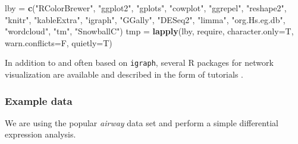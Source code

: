 \documentclass[9pt,a4paper,]{extarticle}
\newenvironment{Shaded}{\begin{snugshade}}{\end{snugshade}}
\newcommand{\KeywordTok}[1]{\textcolor[rgb]{0.13,0.29,0.53}{\textbf{#1}}}
\newcommand{\DataTypeTok}[1]{\textcolor[rgb]{0.13,0.29,0.53}{#1}}
\newcommand{\StringTok}[1]{\textcolor[rgb]{0.31,0.60,0.02}{#1}}
\newcommand{\OperatorTok}[1]{\textcolor[rgb]{0.81,0.36,0.00}{\textbf{#1}}}
\newcommand{\NormalTok}[1]{#1}
\begin{document}
\begin{Shaded}
\begin{Highlighting}[]
\NormalTok{lby =}\StringTok{ }\KeywordTok{c}\NormalTok{(}\StringTok{"RColorBrewer"}\NormalTok{, }\StringTok{"ggplot2"}\NormalTok{, }\StringTok{"gplots"}\NormalTok{, }\StringTok{"cowplot"}\NormalTok{, }
        \StringTok{"ggrepel"}\NormalTok{, }\StringTok{"reshape2"}\NormalTok{, }\StringTok{"knitr"}\NormalTok{, }\StringTok{"kableExtra"}\NormalTok{,}
        \StringTok{"igraph"}\NormalTok{, }\StringTok{"GGally"}\NormalTok{, }
        \StringTok{"DESeq2"}\NormalTok{, }\StringTok{"limma"}\NormalTok{, }\StringTok{"org.Hs.eg.db"}\NormalTok{, }
        \StringTok{"wordcloud"}\NormalTok{, }\StringTok{"tm"}\NormalTok{, }\StringTok{"SnowballC"}\NormalTok{)}
\NormalTok{tmp =}\StringTok{ }\KeywordTok{lapply}\NormalTok{(lby, require, }\DataTypeTok{character.only=}\NormalTok{T, }\DataTypeTok{warn.conflicts=}\NormalTok{F, }\DataTypeTok{quietly=}\NormalTok{T)}
\end{Highlighting}
\end{Shaded}

In addition to and often based on \texttt{igraph}, several R packages for network visualization are available and described in the form of tutorials \citep{Ognyanova2015, Tyner2017}.

\subsubsection{Example data}\label{example-data}

We are using the popular \emph{airway} data set \citep{Himes2014} and perform a simple differential expression analysis.

\begin{Shaded}
\end{Shaded}
\end{document}
